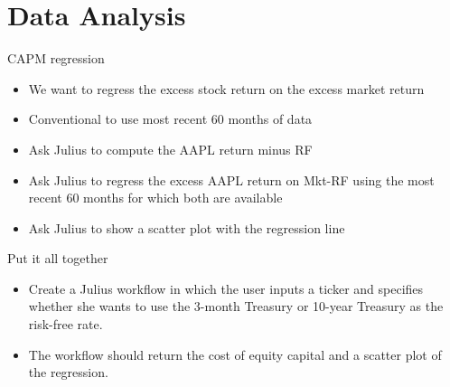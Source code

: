 \documentclass[10pt]{beamer}
\begin{document}
\section{Data Analysis}
\begin{frame}{CAPM regression}
  \begin{itemize}
  \item We want to regress the excess stock return on the excess market return
  \item Conventional to use most recent 60 months of data
  \item Ask Julius to compute the AAPL return minus RF 
  \item Ask Julius to regress the excess AAPL return on Mkt-RF using the most recent 60 months for which both are available
  \item Ask Julius to show a scatter plot with the regression line
\end{itemize}
\end{frame}

\begin{frame}{Put it all together}
    \begin{itemize}
    \item Create a Julius workflow in which the user inputs a ticker and specifies whether she wants to use the 3-month Treasury or 10-year Treasury as the risk-free rate.  
    \item The workflow should return the cost of equity capital and a scatter plot of the regression.
    \end{itemize}
\end{frame}
\end{document}
